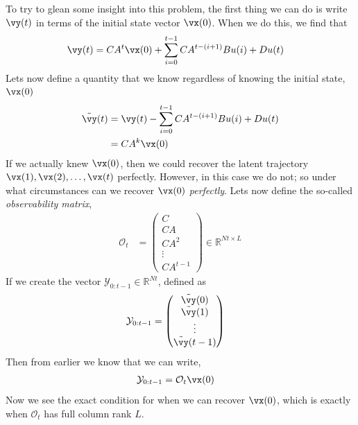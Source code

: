 \documentclass[a4paper,11pt]{exam}
\newcounter{ct}
\newcommand{\field}[1]{\ensuremath{\mathbb{#1}}}
\newcommand{\reals}{\field{R}}
\begin{document}
To try to glean some insight into this problem, the first thing we can do is write $\vy(t)$ in terms of the initial state vector $\vx(0)$.  When we do this, we find that
\begin{align}
    \vy(t) &= CA^t \vx(0) + \sum_{i=0}^{t-1} CA^{t-(i+1)} B u(i) + D u(t)
\end{align}
Lets now define a quantity that we know regardless of knowing the initial state, $\vx(0)$
\begin{align}
    \tilde{\vy}(t) &= \vy(t) - \sum_{i=0}^{t-1} CA^{t-(i+1)} B u(i) + D u(t)\\
    &= CA^k \vx(0)
\end{align}
If we actually knew $\vx(0)$, then we could recover the latent trajectory $\vx(1), \vx(2), \ldots, \vx(t)$ perfectly.  However, in this case we do not; so under what circumstances can we recover $\vx(0)$ \textit{perfectly}.  Lets now define the so-called \textit{observability matrix}, 
\begin{align}
    \mathcal{O}_t &= \begin{pmatrix} C \\ CA \\ CA^2 \\ \vdots \\ CA^{t-1} \end{pmatrix} \in \reals^{Nt \times L}
\end{align}
If we create the vector $\mathcal{Y}_{0:t-1} \in \reals^{Nt}$, defined as
\begin{align}
    \mathcal{Y}_{0:t-1} &= \begin{pmatrix} \tilde{\vy}(0) \\ \tilde{\vy}(1) \\ \vdots \\\tilde{\vy}(t-1) \end{pmatrix}
\end{align}
Then from earlier we know that we can write,
\begin{align}
    \mathcal{Y}_{0:t-1} &= \mathcal{O}_t \vx(0)
\end{align}
Now we see the exact condition for when we can recover $\vx(0)$, which is exactly when $\mathcal{O}_t$ has full column rank $L$. 
\end{document}

